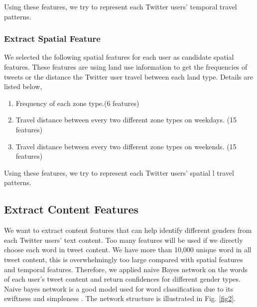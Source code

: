 \documentclass{article}
\begin{document}
Using these features, we try to represent each Twitter users' temporal travel patterns.

\subsubsection{Extract Spatial Feature}

We selected the following spatial features for each user  as candidate spatial features. These features are using land use information to get the frequencies of tweets or the distance the Twitter user travel between each land type. Details are listed below,

\begin{enumerate}
\item Frequency of each zone type.(6 features)
\item Travel distance between every two different zone types on weekdays. (15 features)
\item Travel distance between every two different zone types on weekends. (15 features)
\end{enumerate}

Using these features, we try to represent each Twitter users' spatial l travel patterns.

\subsection{Extract Content Features}

We want to extract content features that can help identify different genders from each Twitter users' text content. Too many features will be used if we directly choose each word in tweet content. We have more than 10,000 unique word in all tweet content, this is overwhelmingly too large compared with spatial features and temporal features. Therefore, we applied naive Bayes network on the words of each user's tweet content and return confidences for different gender types.  Naive bayes network is a good model used for word classification due to its swiftness and simpleness \cite{cheng2010you,hansen2011good}. The network structure is illustrated in Fig. \ref{fig2}.
\end{document}
